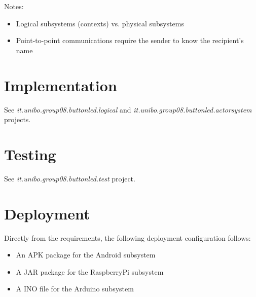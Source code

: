 \documentclass{article}
\newcommand{\labelsec}[1]{\label{sec:#1}}
\newcommand{\mycolor}{myrgb}
\newcommand{\colorize}[1]{{\color{\mycolor}#1}}
\begin{document}
\colorize{
Notes:

\begin{itemize}
  \item Logical subsystems (contexts) vs. physical subsystems
  \item Point-to-point communications require the sender to know the recipient's
  name
\end{itemize}
}


\section{Implementation}
\labelsec{Implementation}

 See \emph{it.unibo.group08.buttonled.logical} and 
 \emph{it.unibo.group08.buttonled.actorsystem} projects.

\section{Testing}
\labelsec{testing}

 See \emph{it.unibo.group08.buttonled.test} project.

\section{Deployment}
\labelsec{Deployment}

 Directly from the requirements, the following deployment configuration follows:
 
 \begin{itemize}
   \item An APK package for the Android subsystem
   \item A JAR package for the RaspberryPi subsystem
   \item A INO file for the Arduino subsystem
 \end{itemize}
\end{document}
